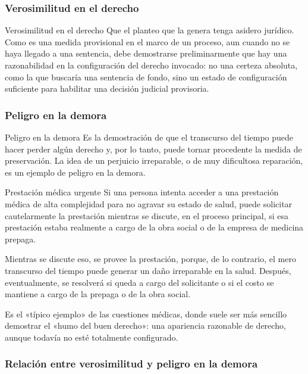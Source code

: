 \documentclass[12pt,oneside]{book}
\begin{document}
\subsubsection{Verosimilitud en el derecho}

\begin{definition}{Verosimilitud en el derecho}
Que el planteo que la genera tenga asidero jurídico. Como es una medida provisional en el marco de un proceso, aun cuando no se haya llegado a una sentencia, debe demostrarse preliminarmente que hay una razonabilidad en la configuración del derecho invocado: no una certeza absoluta, como la que buscaría una sentencia de fondo, sino un estado de configuración suficiente para habilitar una decisión judicial provisoria.
\end{definition}

\subsubsection{Peligro en la demora}

\begin{definition}{Peligro en la demora}
Es la demostración de que el transcurso del tiempo puede hacer perder algún derecho y, por lo tanto, puede tornar procedente la medida de preservación. La idea de un perjuicio irreparable, o de muy dificultosa reparación, es un ejemplo de peligro en la demora.
\end{definition}

\begin{example}{Prestación médica urgente}
Si una persona intenta acceder a una prestación médica de alta complejidad para no agravar su estado de salud, puede solicitar cautelarmente la prestación mientras se discute, en el proceso principal, si esa prestación estaba realmente a cargo de la obra social o de la empresa de medicina prepaga.

Mientras se discute eso, se provee la prestación, porque, de lo contrario, el mero transcurso del tiempo puede generar un daño irreparable en la salud. Después, eventualmente, se resolverá si queda a cargo del solicitante o si el costo se mantiene a cargo de la prepaga o de la obra social.

Es el «típico ejemplo» de las cuestiones médicas, donde suele ser más sencillo demostrar el «humo del buen derecho»: una apariencia razonable de derecho, aunque todavía no esté totalmente configurado.
\end{example}

\subsubsection{Relación entre verosimilitud y peligro en la demora}
\end{document}

